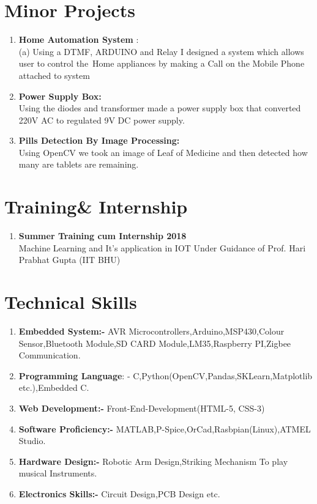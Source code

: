 \documentclass[12pt]{article}
\begin{document}
\section*{\textbf{Minor Projects}}
\begin{enumerate}
  \item{\textbf{Home Automation System}} :\\(a) Using a DTMF, ARDUINO and Relay I designed a system
which allows user to control the\ Home appliances by making a Call on the Mobile
Phone attached to system
\item {\textbf{Power Supply Box:}}\\ Using the diodes and transformer made a power supply box that converted 220V AC to regulated 9V DC power supply.

\item {\textbf{Pills Detection By Image Processing:}}\\ Using OpenCV we took an image of Leaf of Medicine and then detected how many are tablets are remaining.
\end{enumerate}
\section*{\textbf{Training\& Internship}}
\begin{enumerate}
\item
\textbf{Summer Training cum Internship 2018 }\\Machine Learning and It's application in IOT  Under Guidance of Prof. Hari Prabhat Gupta (IIT BHU)
\end{enumerate}

\section*{\textbf{Technical Skills}}
\begin{enumerate}
  \item\textbf{Embedded System:-} AVR Microcontrollers,Arduino,MSP430,Colour Sensor,Bluetooth Module,SD CARD Module,LM35,Raspberry PI,Zigbee Communication.
  \item \textbf{Programming Language}: - C,Python(OpenCV,Pandas,SKLearn,Matplotlib etc.),Embedded C. 
  \item \textbf{ Web Development:-} Front-End-Development(HTML-5, CSS-3)
  \item\textbf{ Software Proficiency:-} MATLAB,P-Spice,OrCad,Rasbpian(Linux),ATMEL Studio.
  \item\textbf{ Hardware Design:-}
  Robotic Arm Design,Striking Mechanism To play musical Instruments.
  \item\textbf{ Electronics Skills:-}
  Circuit Design,PCB Design etc.
\end{enumerate}
\end{document}
